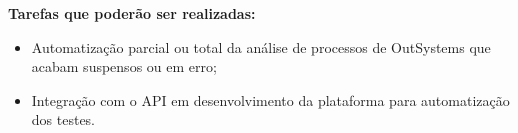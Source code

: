         \textbf{Tarefas que poderão ser realizadas:}
        \begin{itemize}
            \item Automatização parcial ou total da análise de processos de OutSystems que acabam suspensos ou em erro;
            \item Integração com o API em desenvolvimento da plataforma para automatização dos testes. 
        \end{itemize}

        